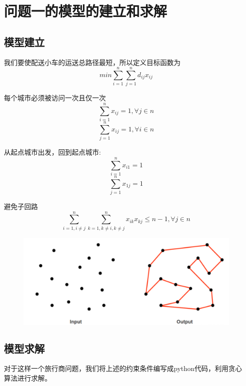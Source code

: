 \documentclass[withoutpreface,bwprint]{thesis-config}
\begin{document}
\clearpage
\section{问题一的模型的建立和求解}
\subsection{模型建立}


\par 我们要使配送小车的运送总路径最短，所以定义目标函数为
\begin{equation}
   min  \sum_{i = 1}^{n}\sum_{j = 1}^{n}  d_{ij} x_{ij}
\end{equation}
\par 每个城市必须被访问一次且仅一次
\begin{equation}
    \sum_{i = 1}^{n}x_{ij} = 1  ,\forall j \in n
\end{equation}
\begin{equation}
     \sum_{j = 1}^{n}x_{ij} = 1  ,\forall i \in n
\end{equation}
\par 从起点城市出发，回到起点城市:
\begin{equation}
    \sum_{i = 1}^{n}x_{i1} = 1
\end{equation}
\begin{equation}
    \sum_{j = 1}^{n}x_{1j} = 1
\end{equation}
\par 避免子回路
\begin{equation}
    \sum_{i = 1,i \ne j}^{n}\sum_{k = 1,k \ne i,k \ne j }^{n}x_{ik}x_{kj} \le n-1,\forall j \in n
\end{equation}

\begin{figure}[htbp]
    \centering
    \includegraphics[width=.9\linewidth]{figures/image1.png}
\end{figure}


\subsection{模型求解}
\par 对于这样一个旅行商问题，我们将上述的约束条件编写成python代码，利用贪心算法进行求解。
\end{document}

